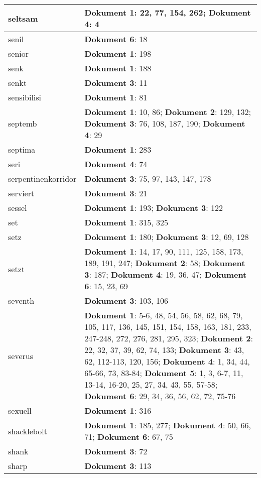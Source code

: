 \documentclass[a5paper]{article}
\begin{document}
\begin{longtable}[l]{|l|p{3in}|}
\hline
seltsam & \textbf{Dokument 1}: 22, 77, 154, 262; \textbf{Dokument 4}: 4 \\
\hline
senil & \textbf{Dokument 6}: 18 \\
\hline
senior & \textbf{Dokument 1}: 198 \\
\hline
senk & \textbf{Dokument 1}: 188 \\
\hline
senkt & \textbf{Dokument 3}: 11 \\
\hline
sensibilisi & \textbf{Dokument 1}: 81 \\
\hline
septemb & \textbf{Dokument 1}: 10, 86; \textbf{Dokument 2}: 129, 132; \textbf{Dokument 3}: 76, 108, 187, 190; \textbf{Dokument 4}: 29 \\
\hline
septima & \textbf{Dokument 1}: 283 \\
\hline
seri & \textbf{Dokument 4}: 74 \\
\hline
serpentinenkorridor & \textbf{Dokument 3}: 75, 97, 143, 147, 178 \\
\hline
serviert & \textbf{Dokument 3}: 21 \\
\hline
sessel & \textbf{Dokument 1}: 193; \textbf{Dokument 3}: 122 \\
\hline
set & \textbf{Dokument 1}: 315, 325 \\
\hline
setz & \textbf{Dokument 1}: 180; \textbf{Dokument 3}: 12, 69, 128 \\
\hline
setzt & \textbf{Dokument 1}: 14, 17, 90, 111, 125, 158, 173, 189, 191, 247; \textbf{Dokument 2}: 58; \textbf{Dokument 3}: 187; \textbf{Dokument 4}: 19, 36, 47; \textbf{Dokument 6}: 15, 23, 69 \\
\hline
seventh & \textbf{Dokument 3}: 103, 106 \\
\hline
severus & \textbf{Dokument 1}: 5-6, 48, 54, 56, 58, 62, 68, 79, 105, 117, 136, 145, 151, 154, 158, 163, 181, 233, 247-248, 272, 276, 281, 295, 323; \textbf{Dokument 2}: 22, 32, 37, 39, 62, 74, 133; \textbf{Dokument 3}: 43, 62, 112-113, 120, 156; \textbf{Dokument 4}: 1, 34, 44, 65-66, 73, 83-84; \textbf{Dokument 5}: 1, 3, 6-7, 11, 13-14, 16-20, 25, 27, 34, 43, 55, 57-58; \textbf{Dokument 6}: 29, 34, 36, 56, 62, 72, 75-76 \\
\hline
sexuell & \textbf{Dokument 1}: 316 \\
\hline
shacklebolt & \textbf{Dokument 1}: 185, 277; \textbf{Dokument 4}: 50, 66, 71; \textbf{Dokument 6}: 67, 75 \\
\hline
shank & \textbf{Dokument 3}: 72 \\
\hline
sharp & \textbf{Dokument 3}: 113 \\

\end{longtable}
\end{document}

